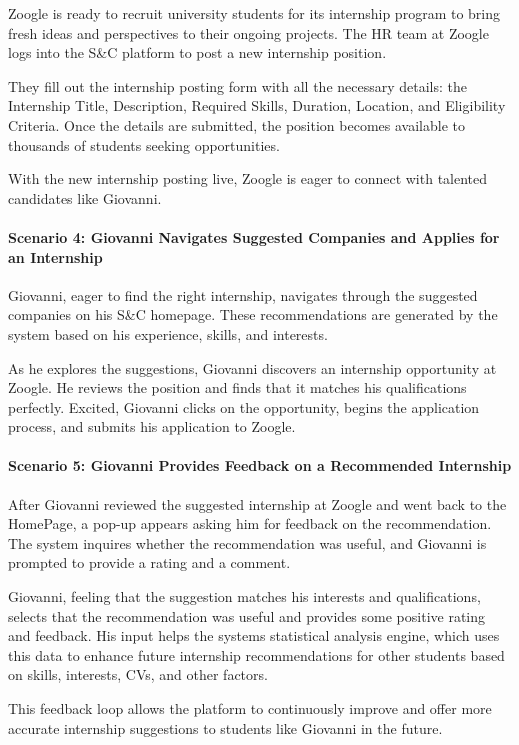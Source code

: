 Zoogle is ready to recruit university students for its internship
program to bring fresh ideas and perspectives to their ongoing projects.
The HR team at Zoogle logs into the S\&C platform to post a new
internship position.

They fill out the internship posting form with all the necessary
details: the Internship Title, Description, Required Skills, Duration,
Location, and Eligibility Criteria. Once the details are submitted, the
position becomes available to thousands of students seeking
opportunities.

With the new internship posting live, Zoogle is eager to connect with
talented candidates like Giovanni.

\paragraph{Scenario 4: Giovanni Navigates Suggested Companies and Applies
for an Internship
}Giovanni, eager to find the right internship, navigates through the
suggested companies on his S\&C homepage. These recommendations are
generated by the system based on his experience, skills, and interests.

As he explores the suggestions, Giovanni discovers an internship
opportunity at Zoogle. He reviews the position and finds that it matches
his qualifications perfectly. Excited, Giovanni clicks on the
opportunity, begins the application process, and submits his application
to Zoogle.

\paragraph{Scenario 5: Giovanni Provides Feedback on a Recommended
Internship}
After Giovanni reviewed the suggested internship at Zoogle and went back
to the HomePage, a pop-up appears asking him for feedback on the
recommendation. The system inquires whether the recommendation was
useful, and Giovanni is prompted to provide a rating and a comment.

Giovanni, feeling that the suggestion matches his interests and
qualifications, selects that the recommendation was useful and provides
some positive rating and feedback. His input helps the
system\textquotesingle s statistical analysis engine, which uses this
data to enhance future internship recommendations for other students
based on skills, interests, CVs, and other factors.

This feedback loop allows the platform to continuously improve and offer
more accurate internship suggestions to students like Giovanni in the
future.

